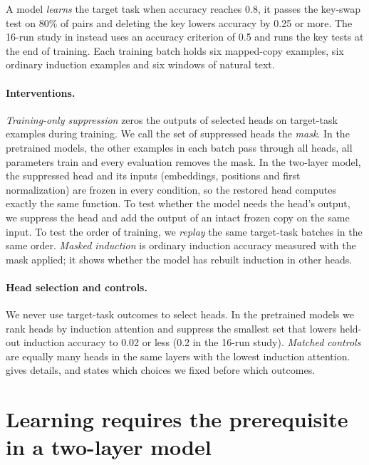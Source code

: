 A model \emph{learns} the target task when accuracy reaches 0.8, it passes the
key-swap test on 80\% of pairs and deleting the key lowers accuracy by 0.25 or more.
The 16-run study in  instead uses an accuracy criterion of 0.5
and runs the key tests at the end of training. Each training batch holds six
mapped-copy examples, six ordinary induction examples and six windows of natural
text.

\paragraph{Interventions.}
\emph{Training-only suppression} zeros the outputs of selected heads on target-task
examples during training. We call the set of suppressed heads the \emph{mask}. In
the pretrained models, the other examples in each batch pass through all heads, all
parameters train and every evaluation removes the mask. In the two-layer model, the
suppressed head and its inputs (embeddings, positions and first normalization) are
frozen in every condition, so the restored head computes exactly the same function.
To test whether the model needs the head's output, we suppress the head and add the
output of an intact frozen copy on the same input. To test the order of training, we
\emph{replay} the same target-task batches in the same order. \emph{Masked
induction} is ordinary induction accuracy measured with the mask applied; it shows
whether the model has rebuilt induction in other heads.

\paragraph{Head selection and controls.}
We never use target-task outcomes to select heads. In the pretrained models we rank
heads by induction attention and suppress the smallest set that lowers held-out
induction accuracy to 0.02 or less (0.2 in the 16-run study). \emph{Matched
controls} are equally many heads in the same layers with the lowest induction
attention.  gives details, and  states which
choices we fixed before which outcomes.

\section{Learning requires the prerequisite in a two-layer model}
\label{sec:controlled}

